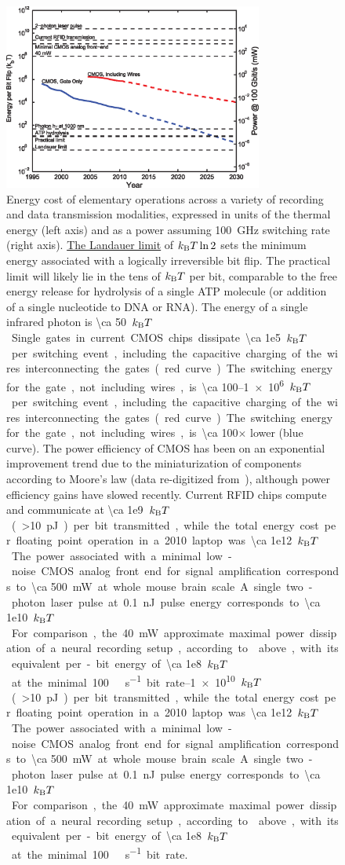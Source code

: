 \begin{figure}[htbp]
\caption{
Energy cost of elementary operations across a variety of recording and data transmission modalities, expressed in units of the thermal energy (left axis) and as a power assuming \SI{100}{\giga\hertz} switching rate (right axis). \hyperref[eq:landauer]{The Landauer limit} of $k_{\text{\scriptsize B}} T \ln 2$ sets the minimum energy associated with a logically irreversible bit flip. The practical limit will likely lie in the tens of $k_{\text{\scriptsize B}} T$ per bit, comparable to the free energy release for hydrolysis of a single ATP molecule (or addition of a single nucleotide to DNA or RNA). The energy of a single infrared photon is \SI{\ca 50}{$k_{\text{\scriptsize B}} T$}. Single gates in current CMOS chips dissipate \SIrange{\ca 1e5}{1e6}{$k_{\text{\scriptsize B}} T$} per switching event, including the capacitive charging of the wires interconnecting the gates (red curve). The switching energy for the gate, not including wires, is \num{\ca 100}$\times$ lower (blue curve). The power efficiency of CMOS has been on an exponential improvement trend due to the miniaturization of components according to Moore's law (data re-digitized from~\cite{tucker11}), although power efficiency gains have slowed recently. Current RFID chips compute and communicate at \SIrange{\ca 1e9}{1e10}{$k_{\text{\scriptsize B}} T$} (\SI{>10}{\pico\joule}) per bit transmitted, while the total energy cost per floating point operation in a 2010 laptop was \SI{\ca 1e12}{$k_{\text{\scriptsize B}} T$}. The power associated with a minimal low-noise CMOS analog front end for signal amplification corresponds to \SI{\ca 500}{\milli\watt} at whole mouse brain scale. A single two-photon laser pulse at \SI{0.1}{\nano\joule} pulse energy corresponds to \SI{\ca 1e10}{$k_{\text{\scriptsize B}} T$}. For comparison, the \SI{40}{\milli\watt} approximate maximal power dissipation of a neural recording setup, according to  above, with its equivalent per-bit energy of \SI{\ca 1e8}{$k_{\text{\scriptsize B}} T$} at the minimal \SI{100}{\giga\bit\per\second} bit rate.
}
\label{fig:cmos}
\centering
\includegraphics[width=0.76\textwidth]{figs/Fig4.eps}
\end{figure}

